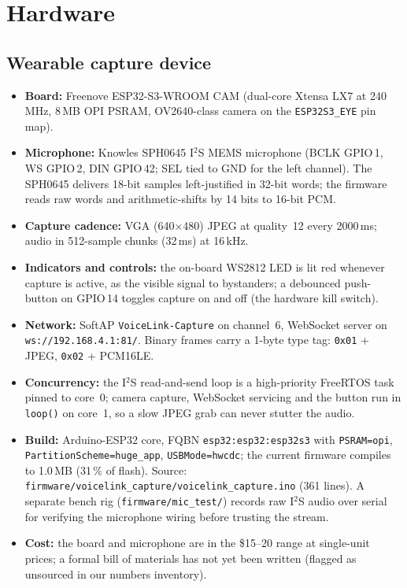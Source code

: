 \documentclass[11pt]{article}
\newcommand{\code}[1]{\texttt{#1}}
\newcommand{\file}[1]{\texttt{\small #1}}
\begin{document}
\section{Hardware}
\subsection{Wearable capture device}
\begin{itemize}
\item \textbf{Board:} Freenove ESP32-S3-WROOM CAM (dual-core Xtensa LX7 at 240\,MHz, 8\,MB OPI PSRAM, OV2640-class camera on the \code{ESP32S3\_EYE} pin map).
\item \textbf{Microphone:} Knowles SPH0645 I$^2$S MEMS microphone (BCLK GPIO\,1, WS GPIO\,2, DIN GPIO\,42; SEL tied to GND for the left channel). The SPH0645 delivers 18-bit samples left-justified in 32-bit words; the firmware reads raw words and arithmetic-shifts by 14 bits to 16-bit PCM.
\item \textbf{Capture cadence:} VGA (640$\times$480) JPEG at quality~12 every 2000\,ms; audio in 512-sample chunks (32\,ms) at 16\,kHz.
\item \textbf{Indicators and controls:} the on-board WS2812 LED is lit red whenever capture is active, as the visible signal to bystanders; a debounced push-button on GPIO\,14 toggles capture on and off (the hardware kill switch).
\item \textbf{Network:} SoftAP \code{VoiceLink-Capture} on channel~6, WebSocket server on \code{ws://192.168.4.1:81/}. Binary frames carry a 1-byte type tag: \code{0x01} + JPEG, \code{0x02} + PCM16LE.
\item \textbf{Concurrency:} the I$^2$S read-and-send loop is a high-priority FreeRTOS task pinned to core~0; camera capture, WebSocket servicing and the button run in \code{loop()} on core~1, so a slow JPEG grab can never stutter the audio.
\item \textbf{Build:} Arduino-ESP32 core, FQBN \code{esp32:esp32:esp32s3} with \code{PSRAM=opi}, \code{PartitionScheme=huge\_app}, \code{USBMode=hwcdc}; the current firmware compiles to 1.0\,MB (31\,\% of flash). Source: \file{firmware/voicelink\_capture/voicelink\_capture.ino} (361 lines). A separate bench rig (\file{firmware/mic\_test/}) records raw I$^2$S audio over serial for verifying the microphone wiring before trusting the stream.
\item \textbf{Cost:} the board and microphone are in the \$15--20 range at single-unit prices; a formal bill of materials has not yet been written (flagged as unsourced in our numbers inventory).
\end{itemize}
\end{document}
